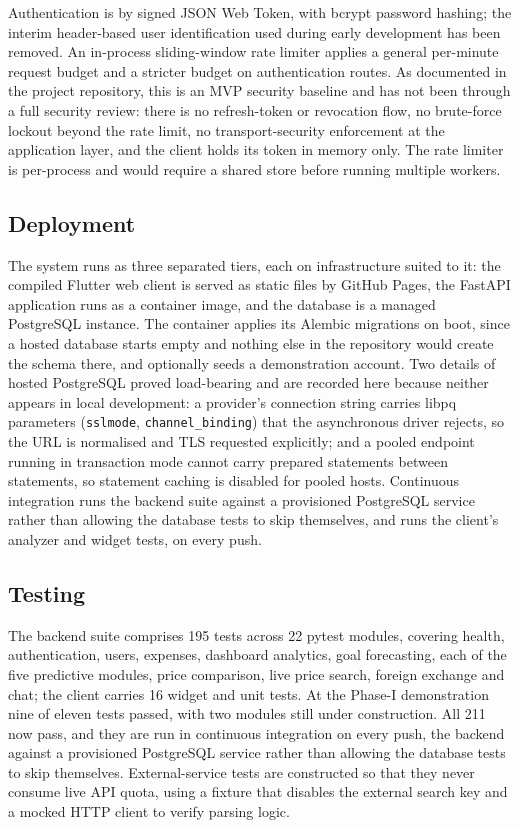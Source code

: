 \documentclass[conference]{IEEEtran}
\begin{document}
Authentication is by signed JSON Web Token, with bcrypt password hashing; the interim header-based user identification used during early development has been removed. An in-process sliding-window rate limiter applies a general per-minute request budget and a stricter budget on authentication routes. As documented in the project repository, this is an MVP security baseline and has not been through a full security review: there is no refresh-token or revocation flow, no brute-force lockout beyond the rate limit, no transport-security enforcement at the application layer, and the client holds its token in memory only. The rate limiter is per-process and would require a shared store before running multiple workers.

\subsection{Deployment}

The system runs as three separated tiers, each on infrastructure suited to
it: the compiled Flutter web client is served as static files by GitHub
Pages, the FastAPI application runs as a container image, and the database
is a managed PostgreSQL instance. The container applies its Alembic
migrations on boot, since a hosted database starts empty and nothing else in
the repository would create the schema there, and optionally seeds a
demonstration account. Two details of hosted PostgreSQL proved
load-bearing and are recorded here because neither appears in local
development: a provider's connection string carries libpq parameters
(\texttt{sslmode}, \texttt{channel\_binding}) that the asynchronous driver
rejects, so the URL is normalised and TLS requested explicitly; and a pooled
endpoint running in transaction mode cannot carry prepared statements
between statements, so statement caching is disabled for pooled hosts.
Continuous integration runs the backend suite against a provisioned
PostgreSQL service rather than allowing the database tests to skip
themselves, and runs the client's analyzer and widget tests, on every push.

\subsection{Testing}

The backend suite comprises 195 tests across 22 pytest modules, covering health, authentication, users, expenses, dashboard analytics, goal forecasting, each of the five predictive modules, price comparison, live price search, foreign exchange and chat; the client carries 16 widget and unit tests. At the Phase-I demonstration nine of eleven tests passed, with two modules still under construction. All 211 now pass, and they are run in continuous integration on every push, the backend against a provisioned PostgreSQL service rather than allowing the database tests to skip themselves. External-service tests are constructed so that they never consume live API quota, using a fixture that disables the external search key and a mocked HTTP client to verify parsing logic.
\end{document}

